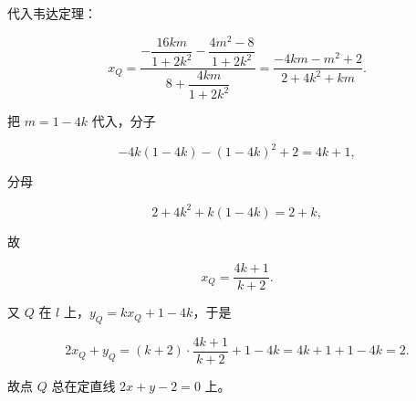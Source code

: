 \begin{answer}
代入韦达定理：

\nopagebreak[4]
\[x_Q=\frac{-\dfrac{16km}{1+2k^2}-\dfrac{4m^2-8}{1+2k^2}}{8+\dfrac{4km}{1+2k^2}}=\frac{-4km-m^2+2}{2+4k^2+km}.\]

把 $m=1-4k$ 代入，分子

\nopagebreak[4]
\[-4k(1-4k)-(1-4k)^2+2=4k+1,\]

分母

\nopagebreak[4]
\[2+4k^2+k(1-4k)=2+k,\]

故

\nopagebreak[4]
\[x_Q=\frac{4k+1}{k+2}.\]

又 $Q$ 在 $l$ 上，$y_Q=kx_Q+1-4k$，于是

\nopagebreak[4]
\[2x_Q+y_Q=(k+2)\cdot\frac{4k+1}{k+2}+1-4k=4k+1+1-4k=2.\]

故点 $Q$ 总在定直线 $2x+y-2=0$ 上。


\end{answer}